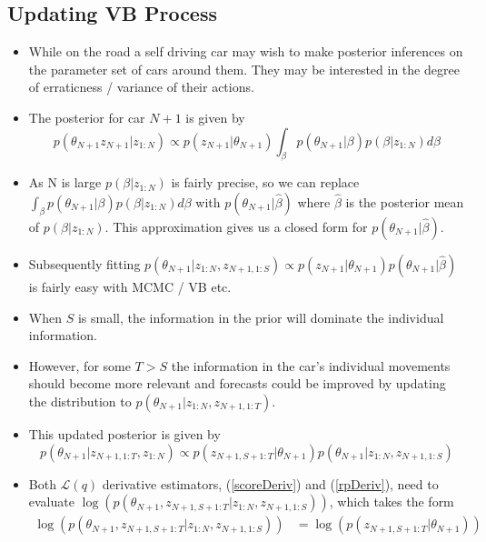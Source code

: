 \documentclass[12pt,a4paper]{article}\usepackage[]{graphicx}\usepackage[]{color}
\begin{document}
\subsection{Updating VB Process}

\begin{itemize}
\item While on the road a self driving car may wish to make posterior inferences on the parameter set of cars around them. They may be interested in the degree of erraticness / variance of their actions.
\item The posterior for car $N+1$ is given by 
\begin{equation}
\label{originalPost}
p(\theta_{N+1} z_{N+1} | z_{1:N}) \propto p(z_{N+1} | \theta_{N+1}) \int_{\beta} p(\theta_{N+1} | \beta) p (\beta | z_{1:N}) d\beta
\end{equation}
\item As N is large $p (\beta | z_{1:N})$ is fairly precise, so we can replace $\int_{\beta} p(\theta_{N+1} | \beta) p (\beta | z_{1:N}) d\beta$ with $ p(\theta_{N+1} | \hat{\beta})$ where $\hat{\beta}$ is the posterior mean of $p(\beta | z_{1:N})$. This approximation gives us a closed form for $ p(\theta_{N+1} | \hat{\beta})$.
\item Subsequently fitting $p(\theta_{N+1} | z_{1:N}, z_{N+1, 1:S})  \propto p(z_{N+1} | \theta_{N+1}) p(\theta_{N+1} | \hat{\beta})$ is fairly easy with MCMC / VB etc.
\item When $S$ is small, the information in the prior will dominate the individual information.
\item However, for some $T > S$ the information in the car's individual movements should become more relevant and forecasts could be improved by updating the distribution to $p(\theta_{N+1} | z_{1:N}, z_{N+1, 1:T})$.
\item This updated posterior is given by
\begin{equation}
\label{updatePost}
p(\theta_{N+1} | z_{N+1, 1:T}, z_{1:N}) \propto p(z_{N+1, S+1:T} | \theta_{N+1})p(\theta_{N+1} | z_{1:N}, z_{N+1, 1:S})
\end{equation}
\item Both $\mathcal{L}(q)$ derivative estimators, (\ref{scoreDeriv}) and (\ref{rpDeriv}), need to evaluate \newline $\log(p(\theta_{N+1}, z_{N+1, S+1:T} | z_{1:N}, z_{N+1, 1:S}))$, which takes the form
\begin{align}
\log(p(\theta_{N+1}, z_{N+1, S+1:T} | z_{1:N}, z_{N+1, 1:S})) &= \log(p(z_{N+1, S+1:T} | \theta_{N+1})) \nonumber \\

\end{align}
\end{itemize}
\end{document}
